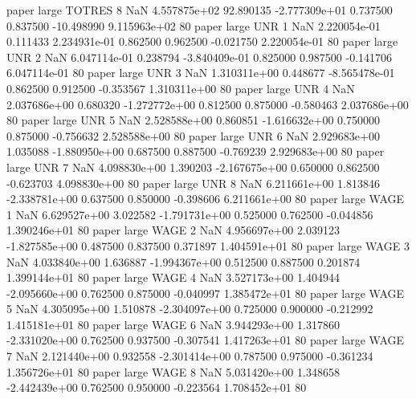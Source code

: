             paper      large   TOTRES                 8                  NaN 4.557875e+02     92.890135 -2.777309e+01 0.737500 0.837500     -10.498990 9.115963e+02 80
            paper      large      UNR                 1                  NaN 2.220054e-01      0.111433  2.234931e-01 0.862500 0.962500      -0.021750 2.220054e-01 80
            paper      large      UNR                 2                  NaN 6.047114e-01      0.238794 -3.840409e-01 0.825000 0.987500      -0.141706 6.047114e-01 80
            paper      large      UNR                 3                  NaN 1.310311e+00      0.448677 -8.565478e-01 0.862500 0.912500      -0.353567 1.310311e+00 80
            paper      large      UNR                 4                  NaN 2.037686e+00      0.680320 -1.272772e+00 0.812500 0.875000      -0.580463 2.037686e+00 80
            paper      large      UNR                 5                  NaN 2.528588e+00      0.860851 -1.616632e+00 0.750000 0.875000      -0.756632 2.528588e+00 80
            paper      large      UNR                 6                  NaN 2.929683e+00      1.035088 -1.880950e+00 0.687500 0.887500      -0.769239 2.929683e+00 80
            paper      large      UNR                 7                  NaN 4.098830e+00      1.390203 -2.167675e+00 0.650000 0.862500      -0.623703 4.098830e+00 80
            paper      large      UNR                 8                  NaN 6.211661e+00      1.813846 -2.338781e+00 0.637500 0.850000      -0.398606 6.211661e+00 80
            paper      large     WAGE                 1                  NaN 6.629527e+00      3.022582 -1.791731e+00 0.525000 0.762500      -0.044856 1.390246e+01 80
            paper      large     WAGE                 2                  NaN 4.956697e+00      2.039123 -1.827585e+00 0.487500 0.837500       0.371897 1.404591e+01 80
            paper      large     WAGE                 3                  NaN 4.033840e+00      1.636887 -1.994367e+00 0.512500 0.887500       0.201874 1.399144e+01 80
            paper      large     WAGE                 4                  NaN 3.527173e+00      1.404944 -2.095660e+00 0.762500 0.875000      -0.040997 1.385472e+01 80
            paper      large     WAGE                 5                  NaN 4.305095e+00      1.510878 -2.304097e+00 0.725000 0.900000      -0.212992 1.415181e+01 80
            paper      large     WAGE                 6                  NaN 3.944293e+00      1.317860 -2.331020e+00 0.762500 0.937500      -0.307541 1.417263e+01 80
            paper      large     WAGE                 7                  NaN 2.121440e+00      0.932558 -2.301414e+00 0.787500 0.975000      -0.361234 1.356726e+01 80
            paper      large     WAGE                 8                  NaN 5.031420e+00      1.348658 -2.442439e+00 0.762500 0.950000      -0.223564 1.708452e+01 80